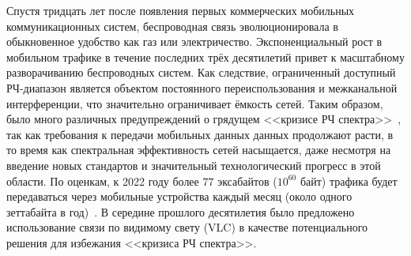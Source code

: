 \Introduction


Спустя тридцать лет после появления первых коммерческих мобильных коммуникационных систем, беспроводная связь эволюционировала в обыкновенное удобство как газ или электричество. Экспоненциальный рост в мобильном трафике в течение последних трёх десятилетий привет к масштабному разворачиванию беспроводных систем. Как следствие, ограниченный доступный РЧ-диапазон является объектом постоянного переиспользования и межканальной интерференции, что значительно ограничивает ёмкость сетей. Таким образом, было много различных предупреждений о грядущем <<кризисе РЧ спектра>>~\cite{Ofcom2013}, так как требования к передачи мобильных данных данных продолжают расти, в то время как спектральная эффективность сетей насыщается, даже несмотря на введение новых стандартов и значительный технологический прогресс в этой области. По оценкам, к 2022 году более $77$ эксабайтов ($10^{60}$ байт) трафика будет передаваться через мобильные устройства каждый месяц (около одного зеттабайта в год)~\cite{Cisco2019}. В середине прошлого десятилетия было предложено использование связи по видимому свету (VLC) в качестве потенциального решения для избежания <<кризиса РЧ спектра>>.



